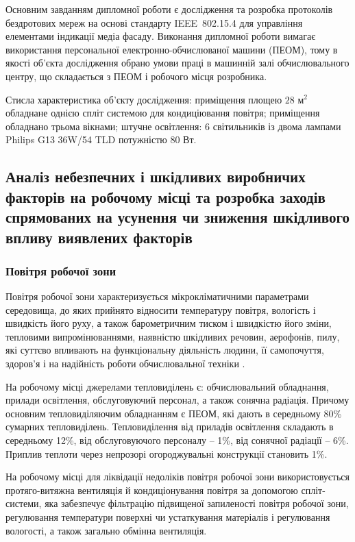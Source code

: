 \documentclass[a4paper,ukrainian,utf8,nocolumnsxix,floatsection,equationsection]{eskdtext}
\renewcommand\paragraph{\subsubsection}
\newcommand{\iee}[0]{IEEE~802.15.4\xspace}
\begin{document}
Основним завданням дипломної роботи є дослідження та розробка протоколів бездротових мереж на основі стандарту \iee для управління елементами індикації медіа фасаду. Виконання дипломної роботи вимагає використання персональної електронно-обчислюваної машини (ПЕОМ), тому в якості об’єкта дослідження обрано умови праці в машинній залі обчислювального центру, що складається з ПЕОМ і робочого місця розробника.

Стисла характеристика об’єкту дослідження: приміщення площею $28 \text{ м}^2$ обладнане однією спліт системою для кондиціювання повітря; приміщення обладнано трьома вікнами; штучне освітлення: 6 світильників із двома лампами Philips G13 36W/54 TLD потужністю 80 Вт.


\subsection{Аналіз небезпечних і шкідливих виробничих факторів на робочому місці та розробка заходів спрямованих на усунення чи зниження шкідливого впливу виявлених факторів}

\paragraph{Повітря робочої зони}

Повітря робочої зони характеризується мікрокліматичними параметрами середовища, до яких прийнято відносити температуру повітря, вологість і швидкість його руху, а також барометричним тиском і швидкістю його зміни, тепловими випромінюваннями, наявністю шкідливих речовин, аерофонів, пилу, які суттєво впливають на функціональну діяльність людини, її самопочуття, здоров'я і на надійність роботи обчислювальної техніки \cite{work:safety:17}. 

На робочому місці джерелами тепловиділень є: обчислювальний обладнання, прилади освітлення, обслуговуючий персонал, а також сонячна радіація. Причому основним тепловиділяючим обладнанням є ПЕОМ, які дають в середньому 80\% сумарних тепловиділень. Тепловиділення від приладів освітлення складають в середньому 12\%, від обслуговуючого персоналу – 1\%, від сонячної радіації – 6\%. Приплив теплоти через непрозорі огороджувальні конструкції становить 1\%.

На робочому місці для ліквідації недоліків повітря робочої зони використовується протяго-витяжна вентиляція й кондиціонування повітря за допомогою спліт-системи, яка забезпечує фільтрацію підвищеної запиленості повітря робочої зони, регулювання температури поверхні чи устаткування матеріалів і регулювання вологості, а також загально обмінна вентиляція.
\end{document}
